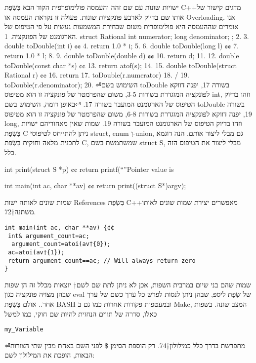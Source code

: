 \begin{טבלא}[!htbp]
      ישויות שונות עם שם זהה והעמסה פולימופרפית
      הקוד הבא בִּשְׂפַת C++מדגים קישור של אותו שם בדיוק לארבע פונקציות שונות. פעולה זו נקראת העמסה או Overloading. אנו אומרים שההעמסה היא פולימופרית משום שבחירת המשמעות נעשית על פי הטיפוס של הארגומנט של הפונקציה.
      1. struct Rational { int numerator; long denominator; };
      2. 3. double toDouble(int i) {¢¢
        4. return 1.0 * i;
      5. }
      6. double toDouble(long l) {¢¢
        7. return 1.0 * l;
      8. }
      9. double toDouble(double d) {¢¢
        10. return d;
      11. }
      12. double toDouble(const char *s) {¢¢
        13. return atof(s);
      14. }
      15. double toDouble(struct Rational r) {¢¢
        16. return
        17. toDouble(r.numerator)
        18. /
        19. toDouble(r.denominator);
      20. }
⏎השימוש בשם toDouble בשורה 17, יפנה דווקא לפונקציה המוגדרת בשורות 3-5, משום שהפרמטר של פונקציה זו הוא מטיפוס int, וזהו בדיוק הטיפוס של הארגומנט המועבר בשורה 17.
⏎באופן דומה, השימוש בשם toDouble בשורה 19, יפנה דווקא לפונקציה המוגדרת בשורות 6-8, משום שהפרמטר של פונקציה זו הוא מטיפוס long, וזהו בדיוק הטיפוס של הארגומנט המועבר בשורה 19.
      שמות שאין מאחוריהם ישויות
      בִּשְׂפַת C ניתן להתייחס לטיפוסי struct, enum וְ-union, גם מבלי ליצור אותם. הנה דוגמא לתכנית מלאה וחוקית בִּשְׂפַת C, שמשתמשת בשם struct S, מבלי ליצור את הטיפוס הזה כלל.

      int print(struct S *p) {¢¢
        return printf(“”Pointer value is %
      }

      int main(int ac, char **av) {¢¢
        return print((struct S*)argv);
      }

      שמות שונים לאותה ישות
      References בִּשְׂפַת C++מאפשרים יצירת שמות שונים לאותו משתנה†{72}.
\begin{verbatim}
int main(int ac, char **av) {¢¢
 int& argument_count=ac;
  argument_count=atoi(av†{0});
 ac=atoi(av†{1});
 return argument_count==ac; // Will always return zero
}
\end{verbatim}

      שמות שהם בני שיום
      במרבית השפות, אכן לא ניתן לתת שם לשם†{ יוצאות מכלל זה הן שפות שבהן מצויה פונקציה כגון eval של שְׂפַת ליספ, שבהן ניתן לנסות לפרש כל ערך כשם של ערך אחר.}. אולם בִּשְׂפַת BASH ובמעטפות פקודות אחרות כמו גם ב Make, המצב שונה. בשפות כאלו, סדרה של תווים הנחזית להיות שם חוקי, כמו למשל
\begin{verbatim}
my_Variable
\end{verbatim}
⏎מתפרשת בדרך כלל כמילולון†{74}. רק הוספת הסימן \$ לפני השם באחת מבין שתי הצורות הבאות, הופכת את המילולון לשם:


\end{טבלא}
